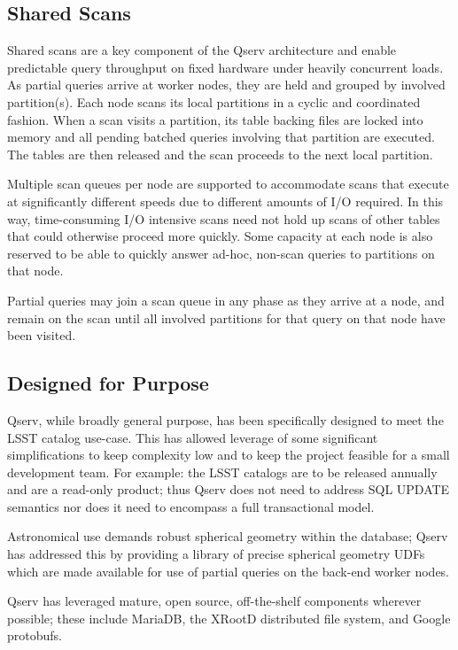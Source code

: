 \documentclass[11pt,twoside]{article}
\begin{document}
\subsection{Shared Scans}

Shared scans are a key component of the Qserv architecture and enable predictable query throughput on fixed
hardware under heavily concurrent loads.  As partial queries arrive at worker nodes, they are held and grouped
by involved partition(s).  Each node scans its local partitions in a cyclic and coordinated fashion. When a
scan visits a partition, its table backing files are locked into memory and all pending batched queries
involving that partition are executed.  The tables are then released and the scan proceeds to the next local
partition.

Multiple scan queues per node are supported to accommodate scans that execute at significantly different
speeds due to different amounts of I/O required.  In this way, time-consuming I/O intensive scans need not
hold up scans of other tables that could otherwise proceed more quickly.  Some capacity at each node is also
reserved to be able to quickly answer ad-hoc, non-scan queries to partitions on that node.

Partial queries may join a scan queue in any phase as they arrive at a node, and remain on the scan until all
involved partitions for that query on that node have been visited.

\subsection{Designed for Purpose}

Qserv, while broadly general purpose, has been specifically designed to meet the LSST catalog use-case. This
has allowed leverage of some significant simplifications to keep complexity low and to keep the project
feasible for a small development team.  For example: the LSST catalogs are to be released annually and are a
read-only product; thus Qserv does not need to address SQL UPDATE semantics nor does it need to encompass a
full transactional model.

Astronomical use demands robust spherical geometry within the database; Qserv has addressed this by providing
a library of precise spherical geometry UDFs which are made available for use of partial queries on the
back-end worker nodes.

Qserv has leveraged mature, open source, off-the-shelf components wherever possible; these include MariaDB,
the XRootD distributed file system, and Google protobufs.
\end{document}
